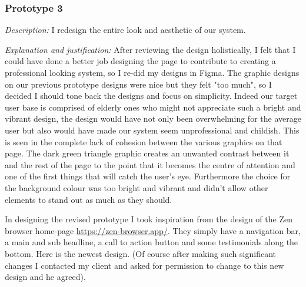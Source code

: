 {\color{gray} \hrulefill} 

\subsubsection{Prototype 3}

\textit{Description:}
I redesign the entire look and aesthetic of our system.
\\ \vspace{0.2cm}

\textit{Explanation and justification:}
After reviewing the design holistically, I felt that I could 
have done a better job designing the page to contribute to 
creating a professional looking system, so I re-did my 
designs in Figma. The graphic designs on our previous 
prototype designs were nice but they felt "too much",
so I decided I should tone back the designs and focus on 
simplicity. Indeed our target user base is comprised of 
elderly ones who might not appreciate such a bright and 
vibrant design, the design would have not only been 
overwhelming for the average user but also would have made 
our system seem unprofessional and childish. This is seen 
in the complete lack of cohesion between the various graphics 
on that page. The dark green triangle graphic creates an 
unwanted contrast between it and the rest of the page to the 
point that it becomes the centre of attention and one of the 
first things that will catch the user's eye.
Furthermore the choice for the background colour
was too bright and vibrant and didn't allow other elements 
to stand out as much as they should.\\ \vspace{0.2cm}

In designing the revised 
prototype I took inspiration from the design of the 
Zen browser home-page \url{https://zen-browser.app/}. They 
simply have a navigation bar, a main and sub headline, a call
to action button and some testimonials along the bottom. Here
is the newest design. (Of course after making such significant
changes I contacted my client and asked for permission to
change to this new design and he agreed). \\

